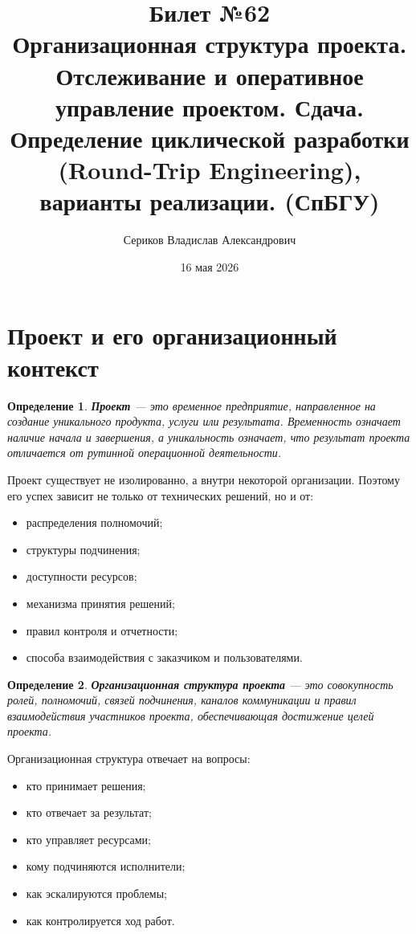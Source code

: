 \documentclass[12pt,a4paper]{article}
\title{Билет №62 \\ \small Организационная структура проекта. Отслеживание и оперативное управление проектом. Сдача. Определение циклической разработки (Round-Trip Engineering), варианты реализации. (СпБГУ)}
\author{Сериков Владислав Александрович}
\date{16 мая 2026}
\newtheorem{definition}{Определение}
\begin{document}
\maketitle
\tableofcontents
\newpage

\section{Проект и его организационный контекст}

\begin{definition}
\textbf{Проект} --- это временное предприятие, направленное на создание уникального продукта, услуги или результата. Временность означает наличие начала и завершения, а уникальность означает, что результат проекта отличается от рутинной операционной деятельности.
\end{definition}

Проект существует не изолированно, а внутри некоторой организации. Поэтому его успех зависит не только от технических решений, но и от:
\begin{itemize}
    \item распределения полномочий;
    \item структуры подчинения;
    \item доступности ресурсов;
    \item механизма принятия решений;
    \item правил контроля и отчетности;
    \item способа взаимодействия с заказчиком и пользователями.
\end{itemize}

\begin{definition}
\textbf{Организационная структура проекта} --- это совокупность ролей, полномочий, связей подчинения, каналов коммуникации и правил взаимодействия участников проекта, обеспечивающая достижение целей проекта.
\end{definition}

Организационная структура отвечает на вопросы:
\begin{itemize}
    \item кто принимает решения;
    \item кто отвечает за результат;
    \item кто управляет ресурсами;
    \item кому подчиняются исполнители;
    \item как эскалируются проблемы;
    \item как контролируется ход работ.
\end{itemize}
\end{document}
